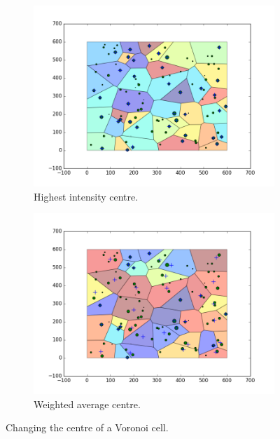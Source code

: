 \begin{figure}[H]
\begin{subfigure}[b]{0.5\textwidth}
  \includegraphics[width=\textwidth]{Images/recentre1.png}
  \caption{Highest intensity centre.}
  \label{fig:recen1}
\end{subfigure}
\hfill
\begin{subfigure}[b]{0.5\textwidth}
  \includegraphics[width=\textwidth]{Images/recentre2.png}
  \caption{Weighted average centre.}
  \label{fig:recen2}
\end{subfigure}
\caption{Changing the centre of a Voronoi cell.}
\label{fig:recentre}
\end{figure}